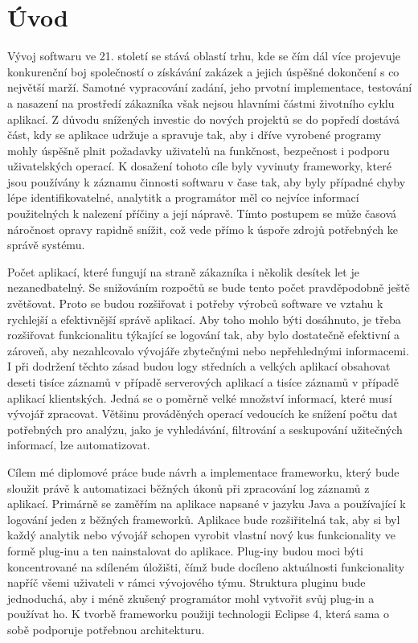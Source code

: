 \documentclass[ing,male,java,dept460]{diploma}		%
\begin{document}
\section{Úvod}
\label{sec:Uvod}
\par Vývoj softwaru ve 21. století se stává oblastí trhu, kde se čím dál více projevuje konkurenční boj společností o získávání zakázek a jejich úspěšné dokončení s co největší marží. Samotné vypracování zadání, jeho prvotní implementace, testování a nasazení na prostředí zákazníka však nejsou hlavními částmi životního cyklu aplikací. Z důvodu snížených investic do nových projektů se do popředí dostává část, kdy se aplikace udržuje a spravuje tak, aby i dříve vyrobené programy mohly úspěšně plnit požadavky uživatelů na funkčnost, bezpečnost i podporu uživatelských operací. K dosažení tohoto cíle byly vyvinuty frameworky, které jsou používány  k záznamu činnosti softwaru v čase tak, aby byly případné chyby lépe identifikovatelné, analytitk a programátor měl co nejvíce informací použitelných k nalezení příčiny a její nápravě. Tímto postupem se může časová náročnost opravy rapidně snížit, což vede přímo k úspoře zdrojů potřebných ke správě systému.
\par Počet aplikací, které fungují na straně zákazníka i několik desítek let je nezanedbatelný. Se snižováním rozpočtů se bude tento počet pravděpodobně ještě zvětšovat. Proto se budou rozšiřovat i potřeby výrobců software ve vztahu k rychlejší a efektivnější správě aplikací. Aby toho mohlo býti dosáhnuto, je třeba rozšiřovat funkcionalitu týkající se logování tak, aby bylo dostatečně efektivní a zároveň, aby nezahlcovalo vývojáře zbytečnými nebo nepřehlednými informacemi. I při dodržení těchto zásad budou logy středních a velkých aplikací obsahovat deseti tisíce záznamů v případě serverových aplikací a tisíce záznamů v případě aplikací klientských. Jedná se o poměrně velké množství informací, které musí vývojář zpracovat. Většinu prováděných operací vedoucích ke snížení počtu dat potřebných pro analýzu, jako je vyhledávání, filtrování a seskupování užitečných informací, lze automatizovat.
\par Cílem mé diplomové práce bude návrh a implementace frameworku, který bude sloužit právě k automatizaci běžných úkonů při zpracování log záznamů z aplikací. Primárně se zaměřím na aplikace napsané v jazyku Java a používající k logování jeden z běžných frameworků. Aplikace bude rozšiřitelná tak, aby si byl každý analytik nebo vývojář schopen vyrobit vlastní nový kus funkcionality ve formě plug-inu a ten nainstalovat do aplikace. Plug-iny budou moci býti koncentrované na sdíleném úložišti, čímž bude docíleno aktuálnosti funkcionality napříč všemi uživateli v rámci vývojového týmu. Struktura pluginu bude jednoduchá, aby i méně zkušený programátor mohl vytvořit svůj plug-in a používat ho. K tvorbě frameworku použiji technologii Eclipse 4, která sama o sobě podporuje potřebnou architekturu.
\end{document}

